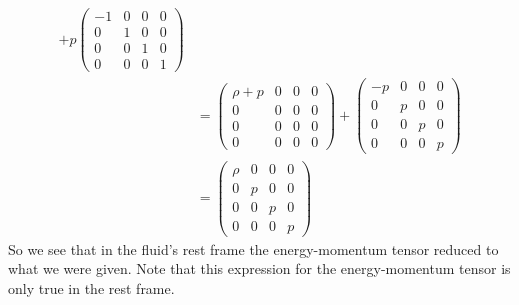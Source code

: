 \documentclass[11pt]{article}
\numberwithin{equation}{section}
\begin{document}
\begin{enumerate}[(a)]
\begin{align*}
+ p\left(\begin{array}{cccc}
		-1 &0 &0 &0\\ 
		0 &1 &0 &0\\ 
		0 &0 &1 &0\\ 
		0 &0 &0 &1
		\end{array}\right)\\
&= \left(\begin{array}{cccc}
		\rho+p &0 &0 &0\\ 
		0 &0 &0 &0\\ 
		0 &0 &0 &0\\ 
		0 &0 &0 &0
		\end{array}\right)
+ \left(\begin{array}{cccc}
		-p &0 &0 &0\\ 
		0 &p &0 &0\\ 
		0 &0 &p &0\\ 
		0 &0 &0 &p
		\end{array}\right)\\
&= \left(\begin{array}{cccc}
		\rho &0 &0 &0\\ 
		0 &p &0 &0\\ 
		0 &0 &p &0\\ 
		0 &0 &0 &p
		\end{array}\right)
\end{align*}
So we see that in the fluid's rest frame the energy-momentum tensor reduced to what we were given. Note that this expression for the energy-momentum tensor is only true in the rest frame.


\end{enumerate}
\end{document}
